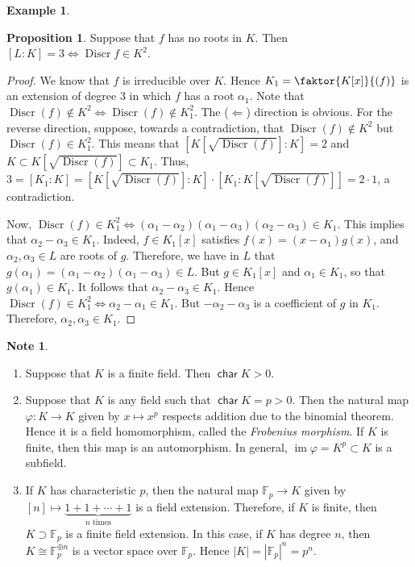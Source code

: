 \documentclass[10pt,letterpaper,cm]{nupset}
\theoremstyle{definition}
\newtheorem{exmp}[definition]{Example}
\newtheorem{note}[definition]{Note}
\theoremstyle{theorem}
\newtheorem{prop}[definition]{Proposition}
\theoremstyle{remark}
\newcommand{\F}{\mathbb F}
\newcommand{\1}{\mathbf{1}}
\newcommand{\0}{\vec 0}
\DeclareMathOperator{\Char}{\mathsf{char}}
\DeclareMathOperator{\im}{im}
\DeclareMathOperator{\disc}{Discr}
\begin{document}
\begin{exmp}
\begin{prop}
Suppose that $f$ has no roots in $K$. Then $[L:K] = 3 \iff \disc{f} \in K^2$.
\end{prop}
\begin{proof}
We know that $f$ is irreducible over $K$. Hence $K_1 = \faktor{K[x]}{(f)}$ is an extension of degree $3$ in which $f$ has a root $\alpha_1$. Note that $\disc(f) \notin K^2 \iff \disc(f) \notin K_1^2$. The ($\Longleftarrow$) direction is obvious. For the reverse direction, suppose, towards a contradiction, that $\disc(f) \notin K^2$ but $\disc(f) \in K_1^2$. This means that $\left[K\left[\sqrt{\disc(f)}\right] :K\right] = 2$ and $K\subset K\left[\sqrt{\disc(f)}\right] \subset K_1$. Thus, $3 = [K_1 : K] = \left[K\left[\sqrt{\disc(f)}\right] : K\right] \cdot \left[K_1 : K\left[\sqrt{\disc(f)}\right]\right] = 2 \cdot 1$, a contradiction. 

\medskip


Now, $\disc(f) \in K_1^2 \iff (\alpha_1 - \alpha_2) ( \alpha_1 - \alpha_3)(\alpha_2 - \alpha_3) \in K_1$. This implies that $\alpha_2 - \alpha_3 \in K_1$. Indeed, $f\in K_1[x]$ satisfies $f(x) = \left(x-\alpha_1\right)g(x)$, and $\alpha_2, \alpha_3 \in L$ are roots of $g$. Therefore, we have in $L$ that $g(\alpha_1) = \left(\alpha_1 - \alpha_2\right)\left(\alpha_1 - \alpha_3\right) \in L$. But $g\in K_1[x]$ and $\alpha_1 \in K_1$, so that $g(\alpha_1) \in K_1$. It follows that $\alpha_2 - \alpha_3 \in K_1$. Hence $\disc(f) \in K_1^2 \iff \alpha_2 - \alpha_1 \in K_1$. But $-\alpha_2 -\alpha_3$ is a coefficient of $g$ in $K_1$. Therefore, $\alpha_2, \alpha_3 \in K_1$. 
\end{proof}
\end{exmp}

\smallskip

\begin{note} $ $
\begin{enumerate}
\item Suppose that $K$ is a finite field. Then $\Char{K}>0$. 
\item Suppose that $K$ is any field such that $\Char{K} = p>0$. Then the natural map $\varphi : K \to K$ given by $x \mapsto x^p$ respects addition due to the binomial theorem. Hence it is a field homomorphism, called the \textit{Frobenius morphism}. If $K$ is finite, then this map is an automorphism. In general, $\im{\varphi} =K^p \subset K$ is a subfield. 
\item If $K$ has characteristic $p$, then the natural map $\F_p \to K$ given by $[n] \mapsto \underbrace{1 + 1 +\cdots +1}_{n \text{ times}}$ is a field extension. Therefore, if $K$ is finite, then $K\supset \F_p$ is a finite field extension. In this case, if $K$ has degree $n$, then $K \cong  \F_p^{\oplus n}$ is a vector space over $\F_p$. Hence $\left\lvert{K}\right\rvert = \left\lvert{\F_p}\right\rvert^n = p^n$. 
\end{enumerate}
\end{note}
\end{document}
